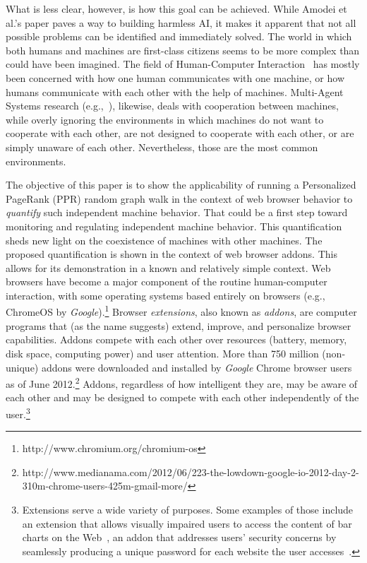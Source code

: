 \documentclass[10pt,letterpaper]{article}
\begin{document}
What is less clear, however, is how this goal can be achieved. While Amodei et al.'s paper paves a way to building harmless AI, it makes it apparent that not all possible problems can be identified and immediately solved. The world in which both humans and machines are first-class citizens seems to be more complex than could have been imagined. The field of Human-Computer Interaction~\cite{dix2009human} has mostly been concerned with how one human communicates with one machine, or how humans communicate with each other with the help of machines. Multi-Agent Systems research (e.g.,~\cite{olfati2007consensus}), likewise, deals with cooperation between machines, while overly ignoring the environments in which machines do not want to cooperate with each other, are not designed to cooperate with each other, or are simply unaware of each other. Nevertheless, those are the most common environments.

The objective of this paper is to show the applicability of running a Personalized PageRank (PPR) random graph walk in the context of web browser behavior to \textit{quantify} such independent machine behavior. That could be a first step toward monitoring and regulating independent machine behavior. This quantification sheds new light on the coexistence of machines with other machines. The proposed quantification is shown in the context of web browser addons. This allows for its demonstration in a known and relatively simple context. Web browsers have become a major component of the routine human-computer interaction, with some operating systems based entirely on browsers (e.g., ChromeOS by \textit{Google}).\footnote{ http://www.chromium.org/chromium-os} Browser \textit{extensions}, also known as \textit{addons}, are computer programs that (as the name suggests) extend, improve, and personalize browser capabilities. Addons compete with each other over resources (battery, memory, disk space, computing power) and user attention. More than 750 million (non-unique) addons were downloaded and installed by \textit{Google} Chrome browser users as of June 2012.\footnote{ http://www.medianama.com/2012/06/223-the-lowdown-google-io-2012-day-2-310m-chrome-users-425m-gmail-more/} Addons, regardless of how intelligent they are, may be aware of each other and may be designed to compete with each other independently of the user.\footnote{Extensions serve a wide variety of purposes. Some examples of those include an extension that allows visually impaired users to access the content of bar charts on the Web~\cite{elzer2007browser}, an addon that addresses users' security concerns by seamlessly producing a unique password for each website the user accesses~\cite{ross2005stronger}.} 
\end{document}
